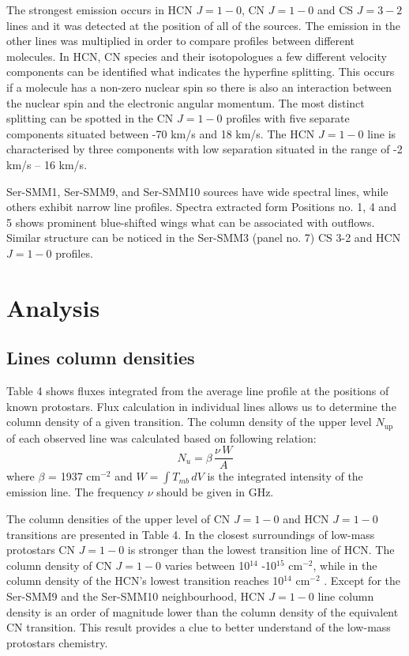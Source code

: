 \documentclass{aa}
\begin{document}
The strongest emission occurs in HCN $J=1-0$, CN $J=1-0$ and CS $J=3-2$ lines and it was detected at the position of all of the sources. The emission in the other lines was multiplied in order to compare profiles between different molecules. In HCN, CN species and their isotopologues a few different velocity components can be identified what indicates the hyperfine splitting. This occurs if a molecule has a non-zero nuclear spin so there is also an interaction between the nuclear spin and the electronic angular momentum. The most distinct splitting can be spotted in the CN $J=1-0$ profiles with five separate components situated between -70 km/s and 18 km/s. The HCN $J=1-0$ line is characterised by three components with low separation situated in the range of -2 km/s – 16 km/s. 

Ser-SMM1, Ser-SMM9, and Ser-SMM10 sources have wide spectral lines, while others exhibit narrow line profiles. Spectra extracted form Positions no. 1, 4 and 5 shows prominent blue-shifted wings what can be associated with outflows. Similar structure can be noticed in the Ser-SMM3 (panel no. 7) CS 3-2 and HCN $J=1-0$ profiles. 

\section{Analysis}

\subsection{Lines column densities}

Table 4 shows fluxes integrated from the average line profile at the positions of known protostars. 
Flux calculation in individual lines allows us to determine the column density of a given transition. The column density of the upper level $N_\mathrm{up}$ of each observed line was calculated based on following relation:
\begin{equation} \label{eq1}
N_u = \beta \, \frac{\nu \, W}{A}
\end{equation}
where $\beta$ = 1937 cm$^{-2}$ and $W = \int{T_{mb} \, dV}$ is the integrated intensity of the emission line. The frequency $\nu$ should be given in GHz.

The column densities of the upper level of CN $J=1-0$ and HCN $J=1-0$ transitions are presented in Table 4. In the closest surroundings of low-mass protostars CN $J=1-0$ is stronger than the lowest transition line of HCN. The column density of CN $J=1-0$ varies between 10$^{14}$ -10$^{15}$ cm$^{-2}$, while in the column density of the HCN’s lowest transition reaches 10$^{14}$ cm$^{-2}$ . Except for the Ser-SMM9 and the Ser-SMM10 neighbourhood, HCN $J=1-0$ line column density is an order of magnitude lower than the column density of the equivalent CN transition. This result provides a clue to better understand of the low-mass protostars chemistry.  
\end{document}
